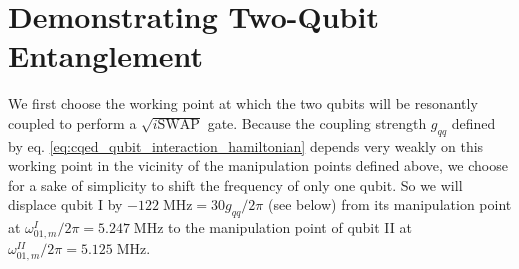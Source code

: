 \section{Demonstrating Two-Qubit Entanglement}

We first choose the working point at which the two qubits will be resonantly coupled to perform a $\sqrt{i\mathrm{SWAP}}$ gate.
Because the coupling strength $g_{qq}$ defined by eq. \ref{eq:cqed_qubit_interaction_hamiltonian} depends very weakly on this working point in the vicinity of the manipulation points defined above, we choose for a sake of simplicity to shift the frequency of only one qubit. So we will displace qubit I by $-122\;\mathrm{MHz}=30 g_{qq}/2\pi$ (see below) from its manipulation point at $\omega_{01,m}^I/2\pi = 5.247\;\mathrm{MHz}$ to the manipulation point of qubit II at  $\omega_{01,m}^{II}/2\pi = 5.125\;\mathrm{MHz}$.

